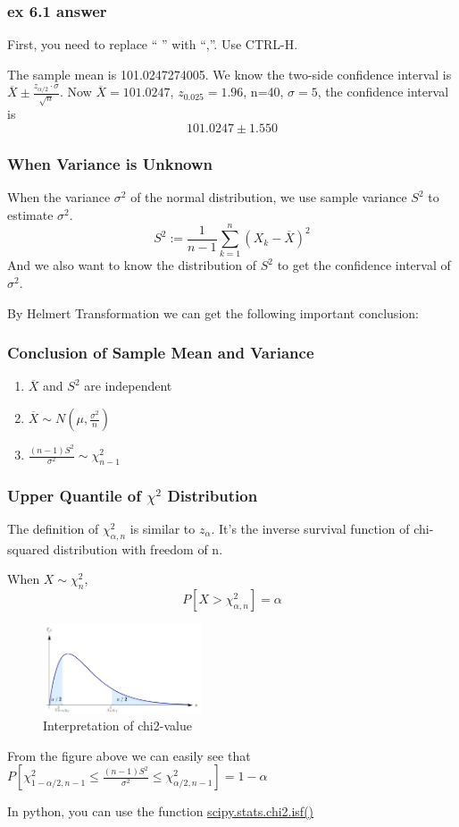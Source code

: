 \documentclass{beamer}
\begin{document}
\begin{frame}
    \frametitle{ex 6.1 answer}
    First, you need to replace `` '' with ``,''. Use CTRL-H.\par
    The sample mean is 101.0247274005. We know the two-side confidence interval is $\overline{X}\pm\frac{z_{\alpha/2}\cdot\sigma}{\sqrt{n}}$. Now $\overline{X}=101.0247$, $z_{0.025}=1.96$, n=40, $\sigma=5$, the confidence interval is 
    \[101.0247\pm 1.550\]

\end{frame}

\begin{frame}
    \frametitle{When Variance is Unknown}
    When the variance $\sigma^2$ of the normal distribution, we use sample variance $S^2$ to estimate $\sigma^2$.
    \[S^2:=\frac{1}{n-1}\sum\limits_{k=1}^{n}(X_k-\overline{X})^2\]
    And we also want to know the distribution of $S^2$ to get the confidence interval of $\sigma^2$.\par
    By Helmert Transformation we can get the following important conclusion:


\end{frame}
\begin{frame}
    \frametitle{Conclusion of Sample Mean and Variance}
    \begin{enumerate}
        \item $\overline{X}$ and $S^2$ are independent
        \item $\overline{X}\sim N(\mu, \frac{\sigma^2}{n})$
        \item $\frac{(n-1)S^2}{\sigma^2}\sim \chi^2_{n-1}$
    \end{enumerate}
    
\end{frame}

\begin{frame}
    \frametitle{Upper Quantile of $\chi^2$ Distribution}
    The definition of $\chi^2_{\alpha,n}$ is similar to $z_{\alpha}$. It's the inverse survival function of chi-squared distribution with freedom of n.\par
    When $X\sim \chi^2_{n}$,
    \[P[X>\chi^2_{\alpha,n}]=\alpha\]
    \begin{figure}[H]
        \centering
        \includegraphics[width=0.42\textwidth,height=0.2\textwidth]{chi2val.jpg}
        \caption{Interpretation of chi2-value}
    \end{figure}\par
    From the figure above we can easily see that $P[\chi^2_{1-\alpha/2,n-1}\leq \frac{(n-1)S^2}{\sigma^2} \leq \chi^2_{\alpha/2,n-1}]=1-\alpha$\par
    In python, you can use the function \href{https://docs.scipy.org/doc/scipy/reference/generated/scipy.stats.chi2.html}{scipy.stats.chi2.isf()}

\end{frame}
\end{document}
